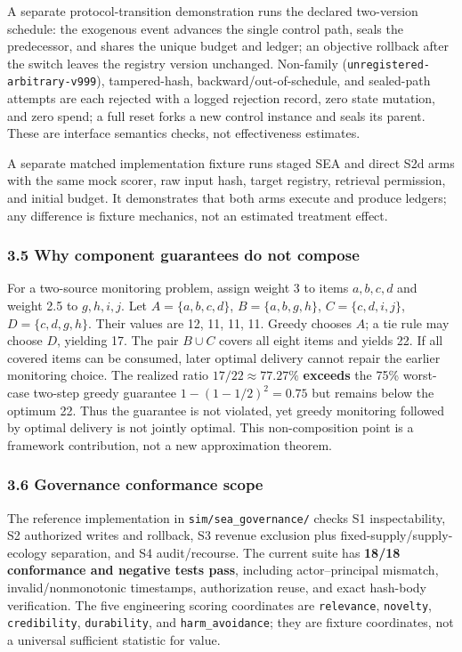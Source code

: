 \documentclass[
  11pt]{article}
\begin{document}
A separate protocol-transition demonstration runs the declared
two-version schedule: the exogenous event advances the single control
path, seals the predecessor, and shares the unique budget and ledger; an
objective rollback after the switch leaves the registry version
unchanged. Non-family (\texttt{unregistered-arbitrary-v999}),
tampered-hash, backward/out-of-schedule, and sealed-path attempts are
each rejected with a logged rejection record, zero state mutation, and
zero spend; a full reset forks a new control instance and seals its
parent. These are interface semantics checks, not effectiveness
estimates.

A separate matched implementation fixture runs staged SEA and direct S2d
arms with the same mock scorer, raw input hash, target registry,
retrieval permission, and initial budget. It demonstrates that both arms
execute and produce ledgers; any difference is fixture mechanics, not an
estimated treatment effect.

\subsubsection{3.5 Why component guarantees do not
compose}\label{why-component-guarantees-do-not-compose}

For a two-source monitoring problem, assign weight 3 to items
\(a,b,c,d\) and weight 2.5 to \(g,h,i,j\). Let \(A=\{a,b,c,d\}\),
\(B=\{a,b,g,h\}\), \(C=\{c,d,i,j\}\), \(D=\{c,d,g,h\}\). Their values
are 12, 11, 11, 11. Greedy chooses \(A\); a tie rule may choose \(D\),
yielding 17. The pair \(B\cup C\) covers all eight items and yields 22.
If all covered items can be consumed, later optimal delivery cannot
repair the earlier monitoring choice. The realized ratio
\(17/22\approx77.27\%\) \textbf{exceeds} the 75\% worst-case two-step
greedy guarantee \(1-(1-1/2)^2=0.75\) but remains below the optimum 22.
Thus the guarantee is not violated, yet greedy monitoring followed by
optimal delivery is not jointly optimal. This non-composition point is a
framework contribution, not a new approximation theorem.

\subsubsection{3.6 Governance conformance
scope}\label{governance-conformance-scope}

The reference implementation in \texttt{sim/sea\_governance/} checks S1
inspectability, S2 authorized writes and rollback, S3 revenue exclusion
plus fixed-supply/supply-ecology separation, and S4 audit/recourse. The
current suite has \textbf{18/18 conformance and negative tests pass},
including actor--principal mismatch, invalid/nonmonotonic timestamps,
authorization reuse, and exact hash-body verification. The five
engineering scoring coordinates are \texttt{relevance},
\texttt{novelty}, \texttt{credibility}, \texttt{durability}, and
\texttt{harm\_avoidance}; they are fixture coordinates, not a universal
sufficient statistic for value.
\end{document}
